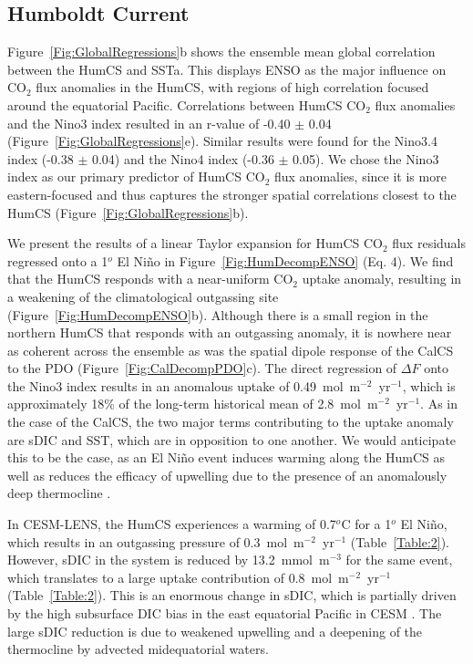 \documentclass[hvmath, online,bgd]{copernicus_discussions}
\begin{document}
\subsection{Humboldt Current}
Figure~\ref{Fig:GlobalRegressions}b shows the ensemble mean global correlation between the HumCS and SSTa. This displays ENSO as the major influence on CO$_{2}$ flux anomalies in the HumCS, with regions of high correlation focused around the equatorial Pacific. Correlations between HumCS CO$_{2}$ flux anomalies and the Nino3 index resulted in an r-value of -0.40 $\pm$ 0.04 (Figure~\ref{Fig:GlobalRegressions}e). Similar results were found for the Nino3.4 index (-0.38 $\pm$ 0.04) and the Nino4 index (-0.36 $\pm$ 0.05). We chose the Nino3 index as our primary predictor of HumCS CO$_{2}$ flux anomalies, since it is more eastern-focused and thus captures the stronger spatial correlations closest to the HumCS (Figure~\ref{Fig:GlobalRegressions}b).

We present the results of a linear Taylor expansion for HumCS CO$_{2}$ flux residuals regressed onto a 1$^{o}$ El Ni\~no in Figure~\ref{Fig:HumDecompENSO} (Eq. 4). We find that the HumCS responds with a near-uniform CO$_{2}$ uptake anomaly, resulting in a weakening of the climatological outgassing site (Figure~\ref{Fig:HumDecompENSO}b). Although there is a small region in the northern HumCS that responds with an outgassing anomaly, it is nowhere near as coherent across the ensemble as was the spatial dipole response of the CalCS to the PDO (Figure~\ref{Fig:CalDecompPDO}c). The direct regression of $\Delta F$ onto the Nino3 index results in an anomalous uptake of 0.49~mol~m$^{-2}$~yr$^{-1}$, which is approximately 18\% of the long-term historical mean of 2.8~mol~m$^{-2}$~yr$^{-1}$. As in the case of the CalCS, the two major terms contributing to the uptake anomaly are sDIC and SST, which are in opposition to one another. We would anticipate this to be the case, as an El Ni\~no event induces warming along the HumCS as well as reduces the efficacy of upwelling due to the presence of an anomalously deep thermocline \citep{Strub:1998}.

In CESM-LENS, the HumCS experiences a warming of 0.7$^{o}$C for a 1$^{o}$ El Ni\~no, which results in an outgassing pressure of 0.3~mol~m$^{-2}$~yr$^{-1}$ (Table~\ref{Table:2}). However, sDIC in the system is reduced by 13.2~mmol~m$^{-3}$ for the same event, which translates to a large uptake contribution of 0.8~mol~m$^{-2}$~yr$^{-1}$ (Table~\ref{Table:2}). This is an enormous change in sDIC, which is partially driven by the high subsurface DIC bias in the east equatorial Pacific in CESM \citep[see][their Figure 2]{Lovenduski:2015}. The large sDIC reduction is due to weakened upwelling and a deepening of the thermocline by advected midequatorial waters.
\end{document}
